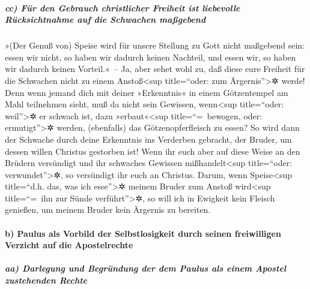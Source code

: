 \hypertarget{cc-fuxfcr-den-gebrauch-christlicher-freiheit-ist-liebevolle-ruxfccksichtnahme-auf-die-schwachen-mauxdfgebend}{%
\subparagraph{cc) Für den Gebrauch christlicher Freiheit ist liebevolle
Rücksichtnahme auf die Schwachen
maßgebend}\label{cc-fuxfcr-den-gebrauch-christlicher-freiheit-ist-liebevolle-ruxfccksichtnahme-auf-die-schwachen-mauxdfgebend}}

 »(Der Genuß von) Speise wird für unsere Stellung zu Gott
nicht maßgebend sein: essen wir nicht, so haben wir dadurch keinen
Nachteil, und essen wir, so haben wir dadurch keinen Vorteil.«~--
 Ja, aber sehet wohl zu, daß diese eure Freiheit für die
Schwachen nicht zu einem Anstoß\textless sup title=``oder: zum
Ärgernis''\textgreater✲ werde!  Denn wenn jemand dich mit
deiner »Erkenntnis« in einem Götzentempel am Mahl teilnehmen sieht, muß
da nicht sein Gewissen, wenn\textless sup title=``oder:
weil''\textgreater✲ er schwach ist, dazu »erbaut«\textless sup
title=``=~bewogen, oder: ermutigt''\textgreater✲ werden, (ebenfalls) das
Götzenopferfleisch zu essen?  So wird dann der Schwache
durch deine Erkenntnis ins Verderben gebracht, der Bruder, um dessen
willen Christus gestorben ist!  Wenn ihr euch aber auf
diese Weise an den Brüdern versündigt und ihr schwaches Gewissen
mißhandelt\textless sup title=``oder: verwundet''\textgreater✲, so
versündigt ihr euch an Christus.  Darum, wenn
Speise\textless sup title=``d.h. das, was ich esse''\textgreater✲ meinem
Bruder zum Anstoß wird\textless sup title=``=~ihn zur Sünde
verführt''\textgreater✲, so will ich in Ewigkeit kein Fleisch genießen,
um meinem Bruder kein Ärgernis zu bereiten.

\hypertarget{b-paulus-als-vorbild-der-selbstlosigkeit-durch-seinen-freiwilligen-verzicht-auf-die-apostelrechte}{%
\paragraph{b) Paulus als Vorbild der Selbstlosigkeit durch seinen
freiwilligen Verzicht auf die
Apostelrechte}\label{b-paulus-als-vorbild-der-selbstlosigkeit-durch-seinen-freiwilligen-verzicht-auf-die-apostelrechte}}

\hypertarget{aa-darlegung-und-begruxfcndung-der-dem-paulus-als-einem-apostel-zustehenden-rechte}{%
\subparagraph{aa) Darlegung und Begründung der dem Paulus als einem
Apostel zustehenden
Rechte}\label{aa-darlegung-und-begruxfcndung-der-dem-paulus-als-einem-apostel-zustehenden-rechte}}

